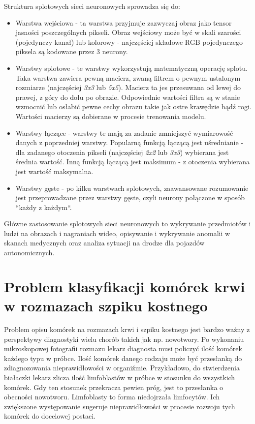 Struktura splotowych sieci neuronowych sprowadza się do:
\begin{itemize}
    \item Warstwa wejściowa - ta warstwa przyjmuje zazwyczaj obraz jako tensor jasności poszczególnych pikseli.
    Obraz wejściowy może być w skali szarości (pojedynczy kanał) lub kolorowy - najczęściej składowe RGB pojedynczego piksela są kodowane przez 3 neurony.
    \item Warstwy splotowe - te warstwy wykorzystują matematyczną operację splotu.
    Taka warstwa zawiera pewną macierz, zwaną filtrem o pewnym ustalonym rozmiarze (najczęściej \textit{3x3} lub \textit{5x5}).
    Macierz ta jes przesuwana od lewej do prawej, z góry do dołu po obrazie.
    Odpowiednie wartości filtra są w stanie wzmocnić lub osłabić pewne cechy obrazu takie jak ostre krawędzie bądź rogi.
    Wartości macierzy są dobierane w procesie trenowania modelu.
    \item Warstwy łączące - warstwy te mają za zadanie zmniejszyć wymiarowość danych z poprzedniej warstwy.
    Popularną funkcją łączącą jest uśrednianie - dla zadanego otoczenia pikseli (najczęściej \textit{2x2} lub \textit{3x3}) wybierana jest średnia wartość.
    Inną funkcją łączącą jest maksimum - z otoczenia wybierana jest wartość maksymalna.
    \item Warstwy gęste - po kilku warstwach splotowych, zaawansowane rozumowanie jest przeprowadzane przez warstwy gęste, czyli neurony połączone w sposób “każdy z każdym“.
\end{itemize}

Główne zastosowanie splotowych sieci neuronowych to wykrywanie przedmiotów i ludzi na obrazach i nagraniach wideo,
opisywanie i wykrywanie anomalii w skanach medycznych oraz analiza sytuacji na drodze dla pojazdów autonomicznych.


\section{Problem klasyfikacji komórek krwi w rozmazach szpiku kostnego}

Problem opisu komórek na rozmazach krwi i szpiku kostnego jest bardzo ważny z perspektywy diagnostyki wielu chorób takich jak np.
nowotwory.
Po wykonaniu mikroskopowej fotografii rozmazu lekarz diagnosta musi policzyć ilość komórek każdego typu w próbce.
Ilość komórek danego rodzaju może być przesłanką do zdiagnozowania nieprawidłowości w organiźmie.
Przykładowo, do stwierdzenia białaczki lekarz zlicza ilość limfoblastów w próbce w stosunku do wszystkich komórek.
Gdy ten stosunek przekracza pewien próg, jest to przesłanka o obecności nowotworu.
Limfoblasty to forma niedojrzała limfocytów.
Ich zwiększone występowanie sugeruje nieprawidłowości w procesie rozwoju tych komórek do docelowej postaci.

